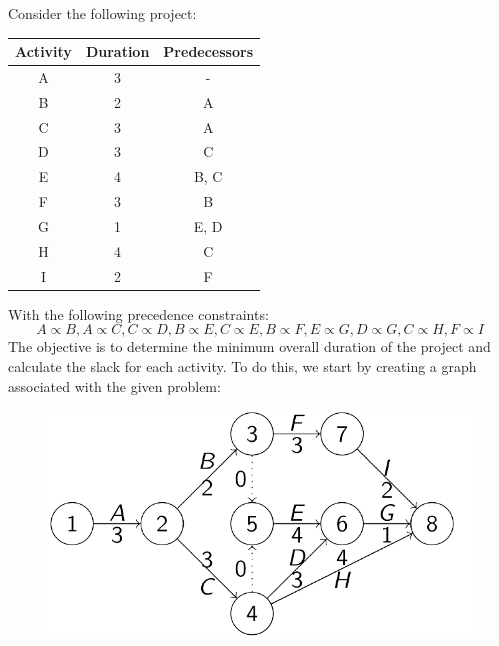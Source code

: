 \documentclass[12pt, a4paper]{report}
\begin{document}
    \begin{example}
        Consider the following project:
        \begin{table}[H]
            \centering
            \begin{tabular}{ccc}
            \hline
            \textbf{Activity} & \textbf{Duration} & \textbf{Predecessors} \\ \hline
            A                 & 3                 & -                     \\
            B                 & 2                 & A                     \\
            C                 & 3                 & A                     \\
            D                 & 3                 & C                     \\
            E                 & 4                 & B, C                  \\
            F                 & 3                 & B                     \\
            G                 & 1                 & E, D                  \\
            H                 & 4                 & C                     \\
            I                 & 2                 & F                     \\ \hline
            \end{tabular}
        \end{table}
        With the following precedence constraints:
        \[A \varpropto B,A \varpropto C,C \varpropto D,B \varpropto E, C \varpropto E,B \varpropto F,E \varpropto G,D \varpropto G,C \varpropto H,F \varpropto I\]
        The objective is to determine the minimum overall duration of the project and calculate the slack for each activity. 
        To do this, we start by creating a graph associated with the given problem:
        \begin{figure}[H]
            \centering
            \includegraphics[width=0.5\linewidth]{images/eproject.png}
        \end{figure}

\end{example}
\end{document}
